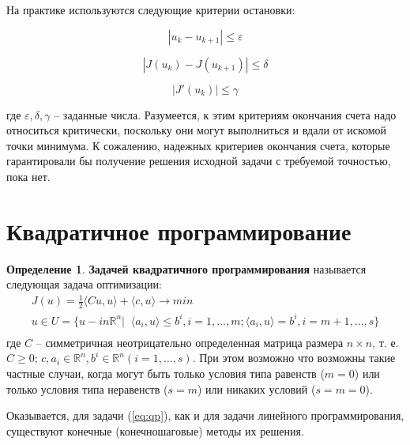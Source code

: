 \documentclass[a4paper, 12pt, titlepage]{article}
\theoremstyle{definition}
\newtheorem{SmartDefinition}{Определение}
\theoremstyle{plain}
\theoremstyle{plain}
\begin{document}
На практике используются следующие критерии остановки:

\begin{equation}
 |u_{k} - u_{k + 1}| \leq \varepsilon
\end{equation}

\begin{equation}
 |J(u_{k}) - J(u_{k + 1})| \leq \delta
\end{equation}

\begin{equation}
 |J'(u_{k})| \leq \gamma
\end{equation}

где $\varepsilon, \delta, \gamma$ -- заданные числа. Разумеется, к этим 
критериям окончания счета надо относиться критически, поскольку они могут
выполниться и вдали от искомой точки минимума. К сожалению, надежных критериев
окончания счета, которые гарантировали бы получение решения исходной задачи с
требуемой точностью, пока нет.






\section{Квадратичное программирование}

\begin{SmartDefinition}
 \textbf{Задачей квадратичного программирования} называется следующая задача
 оптимизации:
 \begin{equation}
  \begin{aligned}
  \label{eq:qp}
  J(u) = \frac{1}{2} \langle C u, u \rangle + \langle c, u \rangle \to min \\
  u \in U = \{u -in \mathbb{R}^{n} | \;\; \langle a_{i}, u \rangle \leq b^{i},
  i = 1, \ldots, m; \langle a_{i}, u \rangle = b^{i}, i = m + 1, \ldots, s\} \\
  \end{aligned}
 \end{equation}
 где $C$ -- симметричная неотрицательно определенная матрица размера
 $n \times n$, т. е.
 $C \geq 0$; $c, a_{i} \in \mathbb{R}^{n}, b^{i} \in \mathbb{R}^{n} (i = 1, 
 \ldots, s)$. При этом возможно что возможны такие частные случаи, когда могут
 быть только условия типа равенств ($m = 0$) или только условия типа неравенств
 ($s = m$) или никаких условий ($s = m = 0$).
\end{SmartDefinition}

Оказывается, для задачи (\ref{eq:qp}), как и для задачи линейного
программирования, существуют конечные (конечношаговые) методы их решения.
\end{document}
